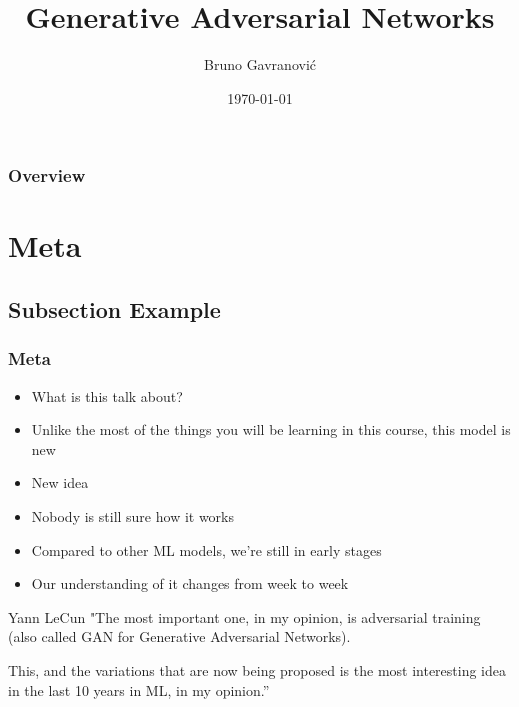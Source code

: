 \documentclass{beamer}
\title[GAN]{Generative Adversarial Networks} %
\author{Bruno Gavranović} %
\institute[PSIML2017] %
{
Petnica Summer School of Machine Learning\\ %
\medskip
\textit{bruno.gavranovic@fer.hr} %
}
\date{\today} %
\begin{document}
\begin{frame}
\titlepage %
\end{frame}

\begin{frame}
\frametitle{Overview} %
\tableofcontents %
\end{frame}


\section{Meta} %

\subsection{Subsection Example} %

\begin{frame}
\frametitle{Meta}
\begin{itemize}
	\item What is this talk about?
	\item Unlike the most of the things you will be learning in this course, this model is new
	\item New idea
	\item Nobody is still sure how it works
	\item Compared to other ML models, we're still in early stages
	\item Our understanding of it changes from week to week
\end{itemize}
\begin{block}{Yann LeCun}
"The most important one, in my opinion, is adversarial training (also called GAN for Generative Adversarial Networks).

This, and the variations that are now being proposed is the most interesting idea in the last 10 years in ML, in my opinion.”
\end{block}
\end{frame}
\end{document}
